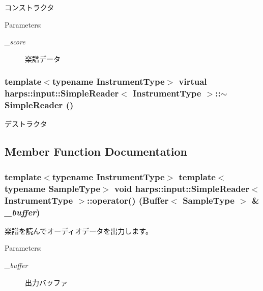 コンストラクタ \begin{Desc}
\item[Parameters:]
\begin{description}
\item[{\em \_\-score}]楽譜データ \end{description}
\end{Desc}
\subsubsection[$\sim$SimpleReader]{\setlength{\rightskip}{0pt plus 5cm}template$<$typename InstrumentType$>$ virtual {\bf harps::input::SimpleReader}$<$ InstrumentType $>$::$\sim${\bf SimpleReader} ()\hspace{0.3cm}{\tt  [inline, virtual]}}\label{classharps_1_1input_1_1SimpleReader_ccb001bb398b3b4d647c9f18116d4714}


デストラクタ 

\subsection{Member Function Documentation}
\subsubsection[operator()]{\setlength{\rightskip}{0pt plus 5cm}template$<$typename InstrumentType$>$ template$<$typename SampleType$>$ void {\bf harps::input::SimpleReader}$<$ InstrumentType $>$::operator() ({\bf Buffer}$<$ SampleType $>$ \& {\em \_\-buffer})\hspace{0.3cm}{\tt  [inline]}}\label{classharps_1_1input_1_1SimpleReader_73abaf1fdf42bcdaa8b2c6ffe0fb5cb7}


楽譜を読んでオーディオデータを出力します。 \begin{Desc}
\item[Parameters:]
\begin{description}
\item[{\em \_\-buffer}]出力バッファ \end{description}
\end{Desc}



